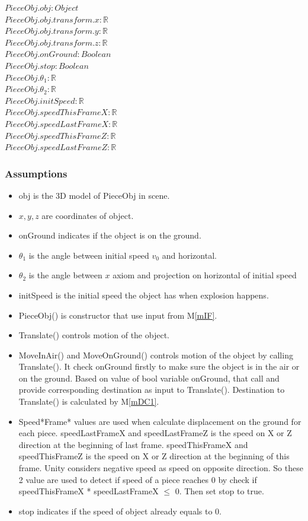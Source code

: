\documentclass[12pt, titlepage]{article}
\newcommand{\mref}[1]{M\ref{#1}}
\begin{document}
$PieceObj.obj: Object$\\
$PieceObj.obj.transform.x: \mathbb{R}$\\
$PieceObj.obj.transform.y: \mathbb{R}$\\
$PieceObj.obj.transform.z: \mathbb{R}$\\
$PieceObj.onGround: Boolean$\\
$PieceObj.stop: Boolean$\\
$PieceObj.\theta_{1}: \mathbb{R}$\\
$PieceObj.\theta_{2}: \mathbb{R}$\\
$PieceObj.initSpeed: \mathbb{R}$\\
$PieceObj.speedThisFrameX: \mathbb{R}$\\
$PieceObj.speedLastFrameX: \mathbb{R}$\\
$PieceObj.speedThisFrameZ: \mathbb{R}$\\
$PieceObj.speedLastFrameZ: \mathbb{R}$

\subsubsection{Assumptions}

\noindent
\begin{itemize}
	\item obj is the 3D model of PieceObj in scene. 	
	\item $x,y,z$ are coordinates of object.	
	\item onGround indicates if the object is on the ground.	 
	\item $\theta_{1}$ is the angle between initial speed $v_{0}$ and horizontal.
	\item $\theta_{2}$ is the angle between $x$ axiom and projection on horizontal of initial speed
	\item initSpeed is the initial speed the object has when explosion happens.
	\item PieceObj() is constructor that use input from \mref{mIF}.
	\item Translate() controls motion of the object.
	\item  MoveInAir() and MoveOnGround() controls motion of the object by calling Translate(). It check onGround firstly to make sure the object is in the air or on the ground. Based on value of bool variable onGround, that call and provide corresponding destination as input to Translate(). Destination to Translate() is calculated by \mref{mDC1}.
	\item Speed*Frame* values are used when calculate displacement on the ground for each piece. speedLastFrameX and speedLastFrameZ is the speed on X or Z direction at the beginning of last frame.
	speedThisFrameX and speedThisFrameZ is the speed on X or Z direction at the beginning of this frame. Unity considers negative speed as speed on opposite direction. So these 2 value are used to detect if speed of a piece reaches 0 by check if speedThisFrameX * speedLastFrameX $\leq$ 0. Then set stop to true.
	\item stop indicates if the speed of object already equals to 0.
\end{itemize}
\end{document}
